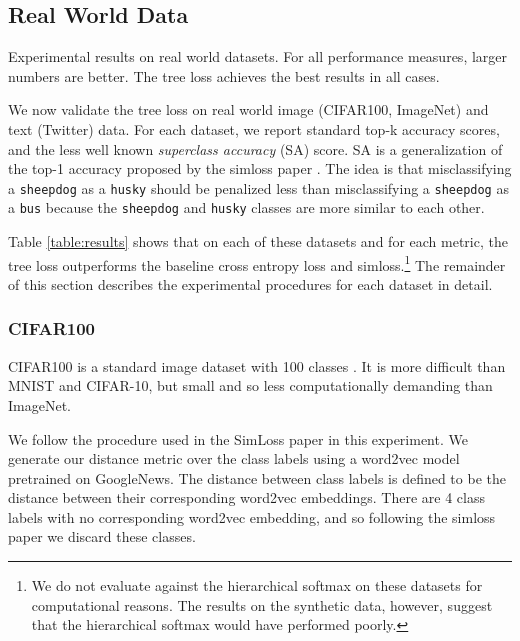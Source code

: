\documentclass[twoside]{article}
\begin{document}

\subsection{Real World Data}

\begin{table}
    \centering
    
    \caption{Experimental results on real world datasets.  For all performance measures, larger numbers are better.  The tree loss achieves the best results in all cases.}
    \label{table:results}
\end{table}

We now validate the tree loss on real world image (CIFAR100, ImageNet) and text (Twitter) data.
For each dataset, we report standard top-k accuracy scores,
and the less well known \emph{superclass accuracy} (SA) score.
SA is a generalization of the top-1 accuracy proposed by the simloss paper \citep{Kobs2020SimLossCS}.
The idea is that misclassifying a \texttt{sheepdog} as a \texttt{husky} should be penalized less than misclassifying a \texttt{sheepdog} as a \texttt{bus} because the \texttt{sheepdog} and \texttt{husky} classes are more similar to each other.

Table \ref{table:results} shows that on each of these datasets and for each metric,
the tree loss outperforms the baseline cross entropy loss and simloss.\footnote{We do not evaluate against the hierarchical softmax on these datasets for computational reasons.  The results on the synthetic data, however, suggest that the hierarchical softmax would have performed poorly.}
The remainder of this section describes the experimental procedures for each dataset in detail.

\subsubsection{CIFAR100}

CIFAR100 is a standard image dataset with 100 classes \citep{krizhevsky2009learning}.
It is more difficult than MNIST and CIFAR-10,
but small and so less computationally demanding than ImageNet.

We follow the procedure used in the SimLoss paper \citep{Kobs2020SimLossCS} in this experiment.
We generate our distance metric over the class labels using a word2vec model \citep{Mikolov2013EfficientEO} pretrained on GoogleNews.
The distance between class labels is defined to be the distance between their corresponding word2vec embeddings.
There are 4 class labels with no corresponding word2vec embedding,
and so following the simloss paper we discard these classes.
\end{document}
